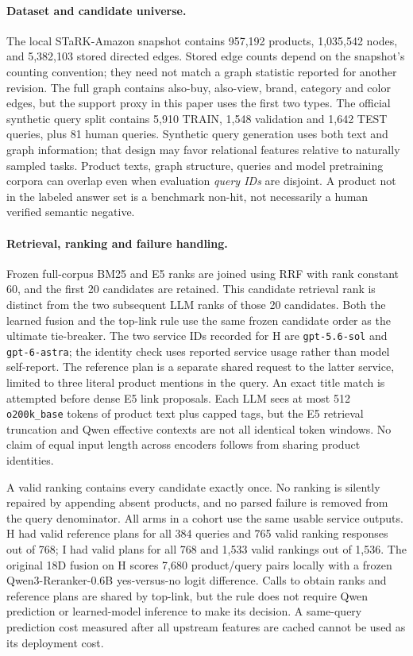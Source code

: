 \paragraph{Dataset and candidate universe.}
 The local STaRK-Amazon snapshot contains 957,192 products, 1,035,542
 nodes, and 5,382,103 stored directed edges. Stored edge counts depend on
 the snapshot's counting convention; they need not match a graph statistic
 reported for another revision. The full graph contains also-buy,
 also-view, brand, category and color edges, but the support proxy in this
 paper uses the first two types. The official synthetic query split contains
 5,910 TRAIN, 1,548 validation and 1,642 TEST queries, plus 81 human queries.
 Synthetic query generation uses both text and graph information; that
 design may favor relational features relative to naturally sampled tasks.
 Product texts, graph structure, queries and model pretraining corpora can
 overlap even when evaluation \emph{query IDs} are disjoint. A product not
 in the labeled answer set is a benchmark non-hit, not necessarily a human
 verified semantic negative.

 \paragraph{Retrieval, ranking and failure handling.}
 Frozen full-corpus BM25 and E5 ranks are joined using RRF with rank
 constant 60, and the first 20 candidates are retained. This candidate
 retrieval rank is distinct from the two subsequent LLM ranks of those
 20 candidates. Both the learned fusion and the top-link rule use the same
 frozen candidate order as the ultimate tie-breaker. The two service IDs
 recorded for H are \texttt{gpt-5.6-sol} and \texttt{gpt-6-astra}; the
 identity check uses reported service usage rather than model self-report.
 The reference plan is a separate shared request to the latter service,
 limited to three literal product mentions in the query. An exact title
 match is attempted before dense E5 link proposals. Each LLM sees at most
 512 \texttt{o200k\_base} tokens of product text plus capped tags, but
 the E5 retrieval truncation and Qwen effective contexts are not all
 identical token windows. No claim of equal input length across encoders
 follows from sharing product identities.

 A valid ranking contains every candidate exactly once. No ranking is
 silently repaired by appending absent products, and no parsed failure is
 removed from the query denominator. All arms in a cohort use the same
 usable service outputs. H had valid reference plans for all 384 queries
 and 765 valid ranking responses out of 768; I had valid plans for all 768
 and 1,533 valid rankings out of 1,536. The original 18D fusion on H
 scores 7,680 product/query pairs locally with a frozen Qwen3-Reranker-0.6B
 yes-versus-no logit difference. Calls to obtain ranks and reference plans
 are shared by top-link, but the rule does not require Qwen prediction or
 learned-model inference to make its decision. A same-query prediction
 cost measured after all upstream features are cached cannot be used as
 its deployment cost.

